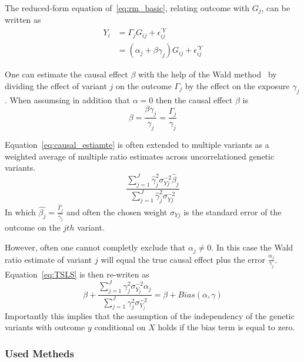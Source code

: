 The reduced-form equation of~\ref{eq:rm_basic}, relating outcome with $G_j$, can be written as
\begin{equation}
	\begin{split}
		Y_i &= \Gamma_j G_{ij} + \epsilon_{ij}^{'Y} \\
		&= (\alpha_j + \beta\gamma_j)G_{ij} + \epsilon_{ij}^{'Y}
	\end{split}
\end{equation}

One can estimate the causal effect $\beta$ with the help of the Wald method~\cite{Wald1940}
by dividing the effect of variant $j$ on the outcome $\Gamma_j$ by the effect on the exposure $\gamma_j$.
When assumsing in addition that $\alpha=0$ then the causal effect $\beta$ is
\begin{equation} \label{eq:causal_estiamte}
	\beta = \frac{\beta\gamma_j}{\gamma_j}= \frac{\Gamma_j}{\gamma_j}
\end{equation}

Equation~\ref{eq:causal_estiamte} is often extended to multiple variants as a weighted average of multiple ratio estimates across uncorrelationed genetic variants.
\begin{equation} \label{eq:IVW}
  \frac{\sum^J_{j=1} \hat{\gamma}_j^2\sigma_{Yj}^{-2} \hat{\beta}_j}
  {\sum^J_{j=1} \hat{\gamma}_j^2\sigma_{Yj}^{-2}}
\end{equation}
In which $\hat{\beta_j} = \frac{\hat{\Gamma_j}}{\hat{\gamma_j}}$ and often the chosen weight $\sigma_{Yj}$ is the standard error of the outcome on the $jth$ variant.

However, often one cannot completly exclude that $\alpha_j \neq 0$.
In this case the Wald ratio estimate of variant $j$ will equal the true causal effect plus the error $\frac{\alpha_j}{\gamma_j}$. 
Equation~\ref{eq:TSLS} is then re-writen as
\begin{equation} \label{eq:TSLSbias}
  \beta + \frac{\sum^J_{j=1} \gamma_j^2\sigma_{Y_j}^{-2} \alpha_j}
  {\sum^J_{j=1} \gamma_j^2\sigma_{Y_j}^{-2}} = \beta + Bias(\alpha, \gamma)
\end{equation}
Importantly this implies that the assumption of the independency of the genetic variants with outcome $y$ conditional on $X$ holds if the bias term is equal to zero.

\subsubsection{Used Metheds}
\label{ssub:Used_Metheds}

